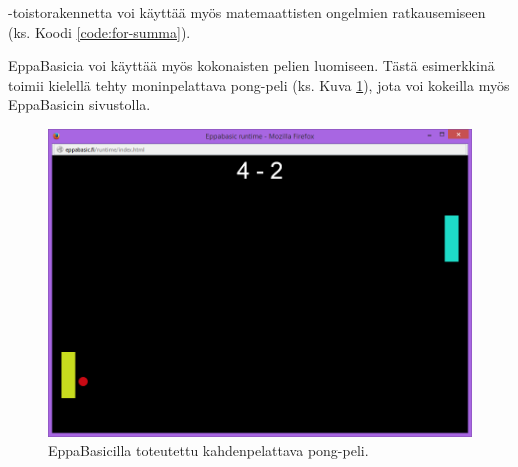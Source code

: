 
-toistorakennetta voi
käyttää myös matemaattisten 
ongelmien ratkausemiseen
(ks. Koodi \ref{code:for-summa}).


EppaBasicia voi käyttää myös
kokonaisten pelien luomiseen.
Tästä esimerkkinä toimii
kielellä tehty moninpelattava
pong-peli (ks. Kuva \ref{img:pong}),
jota voi kokeilla myös
EppaBasicin sivustolla.

\begin{figure}[h]
    \centering
    \includegraphics[width=1\textwidth]{pong}
    \caption{EppaBasicilla toteutettu kahdenpelattava pong-peli.}
    \label{img:pong}
\end{figure}

